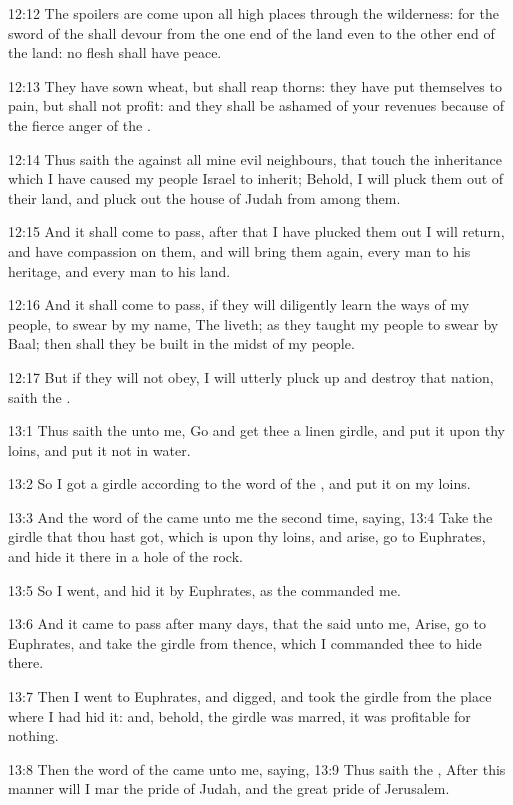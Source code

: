 12:12 The spoilers are come upon all high places through the
wilderness: for the sword of the \LORD shall devour from the one end of
the land even to the other end of the land: no flesh shall have peace.

12:13 They have sown wheat, but shall reap thorns: they have put
themselves to pain, but shall not profit: and they shall be ashamed of
your revenues because of the fierce anger of the \LORD.

12:14 Thus saith the \LORD against all mine evil neighbours, that touch
the inheritance which I have caused my people Israel to inherit;
Behold, I will pluck them out of their land, and pluck out the house
of Judah from among them.

12:15 And it shall come to pass, after that I have plucked them out I
will return, and have compassion on them, and will bring them again,
every man to his heritage, and every man to his land.

12:16 And it shall come to pass, if they will diligently learn the
ways of my people, to swear by my name, The \LORD liveth; as they
taught my people to swear by Baal; then shall they be built in the
midst of my people.

12:17 But if they will not obey, I will utterly pluck up and destroy
that nation, saith the \LORD.

13:1 Thus saith the \LORD unto me, Go and get thee a linen girdle, and
put it upon thy loins, and put it not in water.

13:2 So I got a girdle according to the word of the \LORD, and put it
on my loins.

13:3 And the word of the \LORD came unto me the second time, saying,
13:4 Take the girdle that thou hast got, which is upon thy loins, and
arise, go to Euphrates, and hide it there in a hole of the rock.

13:5 So I went, and hid it by Euphrates, as the \LORD commanded me.

13:6 And it came to pass after many days, that the \LORD said unto me,
Arise, go to Euphrates, and take the girdle from thence, which I
commanded thee to hide there.

13:7 Then I went to Euphrates, and digged, and took the girdle from
the place where I had hid it: and, behold, the girdle was marred, it
was profitable for nothing.

13:8 Then the word of the \LORD came unto me, saying, 13:9 Thus saith
the \LORD, After this manner will I mar the pride of Judah, and the
great pride of Jerusalem.

